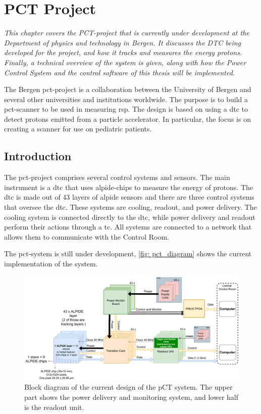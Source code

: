 \documentclass[main.tex]{subfiles}
\begin{document}
\section{PCT Project}
\textit{This chapter covers the PCT-project that is currently under development at the Department of physics and technology in Bergen. It discusses the DTC being developed for the project, and how it tracks and measures the energy protons. Finally, a technical overview of the system is given, along with how the Power Control System and the control software of this thesis will be implemented.}

The Bergen \gls{pct}-project is a collaboration between the University of Bergen and several other universities and institutions worldwide. The purpose is to build a \gls{pct}-scanner to be used in measuring \gls{rsp}. The design is based on using a \acrlong{dtc} to detect protons emitted from a particle accelerator. In particular, the focus is on creating a scanner for use on pediatric patients.


\subsection{Introduction}

The \gls{pct}-project comprises several control systems and sensors. The main instrument is a \gls{dtc} that uses \gls{alpide}-chips to measure the energy of protons. The \gls{dtc} is made out of 43 layers of \gls{alpide} sensors and there are three control systems that oversee the \gls{dtc}. These systems are cooling, readout, and power delivery. The cooling system is connected directly to the \gls{dtc}, while power delivery and readout perform their actions through a \gls{tc}. All systems are connected to a network that allows them to communicate with the Control Room.

The \gls{pct}-system is still under development, \autoref{fig: pct_diagram} shows the current implementation of the system.

\begin{figure}[!ht]
    \centering
    \includegraphics[scale=0.4]{images/pCT_Current_layout-CurrentSystemOverview.pdf}
    \caption{Block diagram of the current design of the pCT system. The upper part shows the power delivery and monitoring system, and lower half is the readout unit.}
    \label{fig: pct_diagram}
\end{figure}
\FloatBarrier
\end{document}

